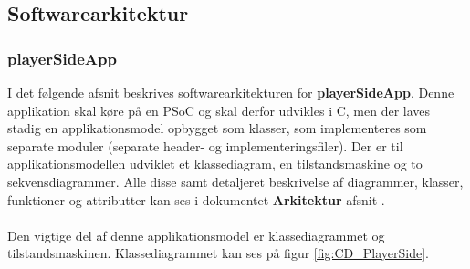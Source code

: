 \documentclass[Rapport/Rapport_main.tex]{subfiles}
\begin{document}
\subsection{Softwarearkitektur}

\subsubsection{playerSideApp}
I det følgende afsnit beskrives softwarearkitekturen for \textbf{playerSideApp}. Denne applikation skal køre på en PSoC og skal derfor udvikles i C, men der laves stadig en  applikationsmodel opbygget som klasser, som implementeres som separate moduler (separate header- og implementeringsfiler). Der er til applikationsmodellen udviklet et klassediagram, en tilstandsmaskine og to sekvensdiagrammer. Alle disse samt detaljeret beskrivelse af diagrammer, klasser, funktioner og attributter kan ses i dokumentet \textbf{Arkitektur} afsnit .\\\\
Den vigtige del af denne applikationsmodel er klassediagrammet og tilstandsmaskinen. Klassediagrammet kan ses på figur \ref{fig:CD_PlayerSide}.
\end{document}
